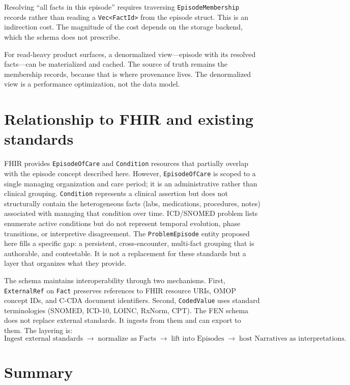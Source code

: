 \documentclass[11pt]{article}
\begin{document}
Resolving ``all facts in this episode'' requires traversing
\texttt{EpisodeMembership} records rather than reading a
\texttt{Vec<FactId>} from the episode struct. This is an indirection cost.
The magnitude of the cost depends on the storage backend, which the schema
does not prescribe.

For read-heavy product surfaces, a denormalized view---episode with its
resolved facts---can be materialized and cached. The source of truth remains
the membership records, because that is where provenance lives. The
denormalized view is a performance optimization, not the data model.




\section{Relationship to FHIR and existing standards}

FHIR provides \texttt{EpisodeOfCare} and \texttt{Condition} resources that
partially overlap with the episode concept described here. However,
\texttt{EpisodeOfCare} is scoped to a single managing organization and care
period; it is an administrative rather than clinical grouping.
\texttt{Condition} represents a clinical assertion but does not structurally
contain the heterogeneous facts (labs, medications, procedures, notes)
associated with managing that condition over time. ICD/SNOMED problem lists
enumerate active conditions but do not represent temporal evolution, phase
transitions, or interpretive disagreement. The \texttt{ProblemEpisode} entity
proposed here fills a specific gap: a persistent, cross-encounter, multi-fact
grouping that is authorable, and contestable. It is not a
replacement for these standards but a layer that organizes what they provide.

The schema maintains interoperability through two mechanisms. First,
\texttt{ExternalRef} on \texttt{Fact} preserves references to FHIR resource
URIs, OMOP concept IDs, and C-CDA document identifiers. Second,
\texttt{CodedValue} uses standard terminologies (SNOMED, ICD-10, LOINC,
RxNorm, CPT). The FEN schema does not replace external standards. It ingests
from them and can export to them. The layering is:
\[
\text{Ingest external standards} \;\rightarrow\;
\text{normalize as Facts} \;\rightarrow\;
\text{lift into Episodes} \;\rightarrow\;
\text{host Narratives as interpretations.}
\]


\section{Summary}
\end{document}
